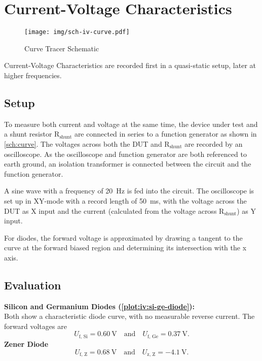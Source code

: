 \chapter{Current-Voltage Characteristics}

\begin{figure}[tbp]
	\centering
	\texttt{[image: img/sch-iv-curve.pdf]}
	\caption{Curve Tracer Schematic}
	\label{sch:curve}
\end{figure}

Current-Voltage Characteristics are recorded first in a quasi-static setup, later at higher frequencies.

\section{Setup}

To measure both current and voltage at the same time, the device under test and a shunt resistor $\mathrm{R_{shunt}}$ are connected in series to a function generator as shown in \autoref{sch:curve}.
The voltages across both the DUT and $\mathrm{R_{shunt}}$ are recorded by an oscilloscope.
As the oscilloscope and function generator are both referenced to earth ground, an isolation transformer is connected between the circuit and the function generator.

A sine wave with a frequency of \SI{20}{\hertz} is fed into the circuit.
The oscilloscope is set up in XY-mode with a record length of \SI{50}{\ms}, with the voltage across the DUT as X input and the current (calculated from the voltage across $\mathrm{R_{shunt}}$) as Y input.

For diodes, the forward voltage is approximated by drawing a tangent to the curve at the forward biased region and determining its intersection with the x axis.

\section{Evaluation}

\textbf{Silicon and Germanium Diodes (\autoref{plot:iv:si-ge-diode}):}\\
Both show a characteristic diode curve, with no measurable reverse current.
The forward voltages are
\begin{equation*}
	U_\text{f, Si} = \SI{0.60}{\volt} \quad \text{and} \quad U_\text{f, Ge} = \SI{0.37}{\volt}.
\end{equation*}
\textbf{Zener Diode}
\begin{equation*}
	U_\text{f, Z} = \SI{0.68}{\volt} \quad \text{and} \quad U_\text{z, Z} = \SI{-4.1}{\volt}.
\end{equation*}

